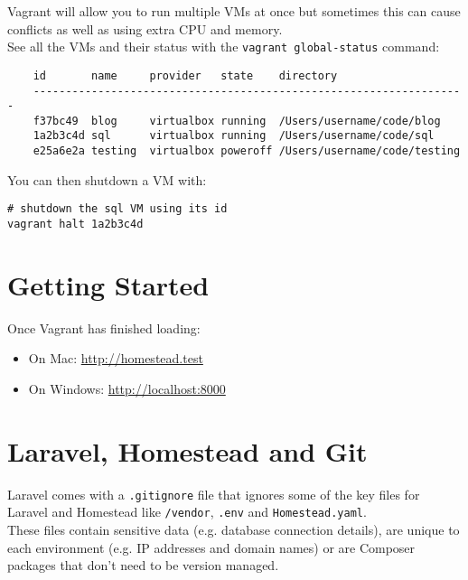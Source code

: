 Vagrant will allow you to run multiple VMs at once but sometimes this can cause conflicts as well as using extra CPU and memory.
\\

See all the VMs and their status with the \texttt{vagrant global-status} command:

\begin{verbatim}
    id       name     provider   state    directory
    -------------------------------------------------------------------
    f37bc49  blog     virtualbox running  /Users/username/code/blog
    1a2b3c4d sql      virtualbox running  /Users/username/code/sql
    e25a6e2a testing  virtualbox poweroff /Users/username/code/testing
\end{verbatim}

You can then shutdown a VM with:

\begin{verbatim}
# shutdown the sql VM using its id
vagrant halt 1a2b3c4d
\end{verbatim}


\pagebreak

\section{Getting Started}

Once Vagrant has finished loading:

\begin{itemize}
    \item On Mac: \href{http://homestead.test}{http://homestead.test}
    \item On Windows: \href{http://localhost:8000}{http://localhost:8000}
\end{itemize}


\section{Laravel, Homestead and Git}

Laravel comes with a \texttt{.gitignore} file that ignores some of the key files for Laravel and Homestead like \texttt{/vendor}, \texttt{.env} and \texttt{Homestead.yaml}.
\\

These files contain sensitive data (e.g. database connection details), are unique to each environment (e.g. IP addresses and domain names) or are Composer packages that don't need to be version managed.

